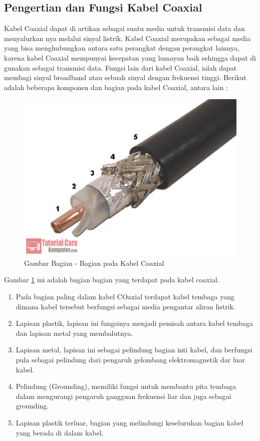 \begin{itemize}
\subsection{Pengertian dan Fungsi Kabel Coaxial}
	Kabel Coaxial dapat di artikan sebagai suatu media untuk transmisi data dan menyalurkan nya melalui sinyal listrik. Kabel Coaxial merupakan sebagai media yang bisa menghubungkan antara satu perangkat dengan perangkat lainnya, karena kabel Coaxial mempunyai kecepatan yang lumayan baik sehingga dapat di gunakan sebagai transmisi data. Fungsi lain dari kabel Coaxial, ialah dapat membagi sinyal broadband atau sebuah sinyal dengan frekuensi tinggi. Berikut adalah beberapa komponen dan bagian pada kabel Coaxial, antara lain :
	\begin{figure} [ht]
	\centerline{\includegraphics[width=1\textwidth]{figures/bgncoax.png}}
	\caption{Gambar Bagian - Bagian pada Kabel Coaxial}
	\label{bgncoax}
	\end{figure}
	Gambar \ref{bgncoax} ini adalah bagian bagian yang terdapat pada kabel coaxial. 
	
		\begin{enumerate}
			\item Pada bagian paling dalam kabel COaxial terdapat kabel tembaga yang dimana kabel tersebut berfungsi sebagai media pengantar aliran listrik.
			\item Lapisan plastik, lapisan ini fungsinya menjadi pemisah antara kabel tembaga dan lapisan metal yang membalutnya.
			\item Lapisan metal, lapisan ini sebagai pelindung bagian inti kabel, dan berfungsi pula sebagai pelindung dari pengaruh gelombang elektromagnetik dar luar kabel.
			\item Pelindung (Grounding), memiliki fungsi untuk membantu pita tembaga dalam mengurangi pengaruh gangguan frekuensi liar dan juga sebagai grounding.
			\item Lapisan plastik terluar, bagian yang melindungi keseluruhan bagian kabel yang berada di dalam kabel.
		\end{enumerate}
		

\end{itemize}

